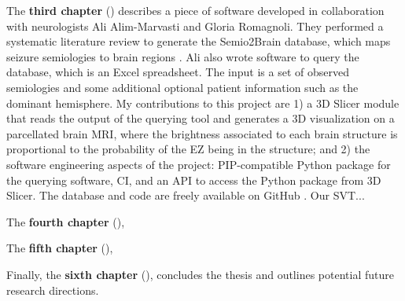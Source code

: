 The \textbf{third chapter} () describes a piece of software developed in collaboration with neurologists Ali Alim-Marvasti and Gloria Romagnoli.
They performed a systematic literature review to generate the Semio2Brain database, which maps seizure semiologies to brain regions \cite{alim-marvasti_probabilistic_2021}.
Ali also wrote software to query the database, which is an Excel spreadsheet.
The input is a set of observed semiologies and some additional optional patient information such as the dominant hemisphere.
My contributions to this project are 1) a 3D Slicer module \cite{fedorov_3d_2012} that reads the output of the querying tool and generates a 3D visualization on a parcellated brain \ac{MRI}, where the brightness associated to each brain structure is proportional to the probability of the \ac{EZ} being in the structure; and 2) the software engineering aspects of the project: \ac{PIP}-compatible Python package for the querying software, \ac{CI}, and an \ac{API} to access the Python package from 3D Slicer.
The database and code are freely available on GitHub%
.
Our \ac{SVT}...  %


The \textbf{fourth chapter} (),


The \textbf{fifth chapter} (),


Finally, the \textbf{sixth chapter} (), concludes the thesis and outlines potential future research directions.
